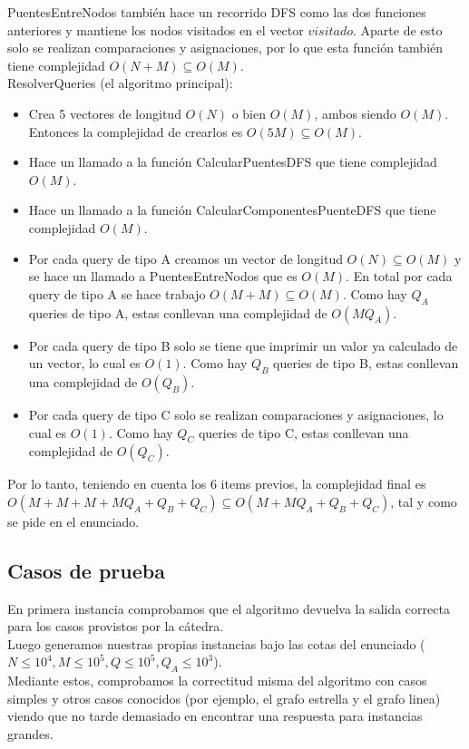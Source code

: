 PuentesEntreNodos también hace un recorrido DFS como las dos funciones anteriores y mantiene los nodos visitados en el vector $visitado$. Aparte
de esto solo se realizan comparaciones y asignaciones, por lo que esta funci\'on tambi\'en tiene complejidad $O(N+M) \subseteq O(M)$. \\

ResolverQueries (el algoritmo principal):
\begin{itemize}
	\item Crea 5 vectores de longitud $O(N)$ o bien $O(M)$, ambos siendo $O(M)$. Entonces la complejidad de crearlos es $O(5M) \subseteq O(M)$.
	\item Hace un llamado a la funci\'on CalcularPuentesDFS que tiene complejidad $O(M)$.
	\item Hace un llamado a la funci\'on CalcularComponentesPuenteDFS que tiene complejidad $O(M)$.
	\item Por cada query de tipo A creamos un vector de longitud $O(N) \subseteq O(M)$ y se hace un llamado a 
	PuentesEntreNodos que es $O(M)$. En total por cada query de tipo A se hace trabajo $O(M+M) \subseteq O(M)$. Como
	hay $Q_A$ queries de tipo A, estas conllevan una complejidad de $O(MQ_A)$.
	\item Por cada query de tipo B solo se tiene que imprimir un valor ya calculado de un vector, lo cual es $O(1)$. Como
	hay $Q_B$ queries de tipo B, estas conllevan una complejidad de $O(Q_B)$.
	\item Por cada query de tipo C solo se realizan comparaciones y asignaciones, lo cual es $O(1)$. Como
	hay $Q_C$ queries de tipo C, estas conllevan una complejidad de $O(Q_C)$.
\end{itemize}

Por lo tanto, teniendo en cuenta los 6 items previos, la complejidad final es $O(M+M+M+MQ_A+Q_B+Q_C) \subseteq O(M+MQ_A+Q_B+Q_C)$, tal y como
se pide en el enunciado.

\subsection{Casos de prueba}

En primera instancia comprobamos que el algoritmo devuelva la salida correcta para los casos provistos por la cátedra. \\
Luego generamos nuestras propias instancias bajo las cotas del enunciado ($N  \leq  10^4, M \leq 10^5,Q \leq 10^5,Q_A  \leq 10^3$). \\
Mediante estos, comprobamos la correctitud misma del algoritmo con casos simples y otros casos conocidos 
(por ejemplo, el grafo estrella y el grafo linea) viendo que no tarde demasiado en encontrar una respuesta para instancias grandes. \\

